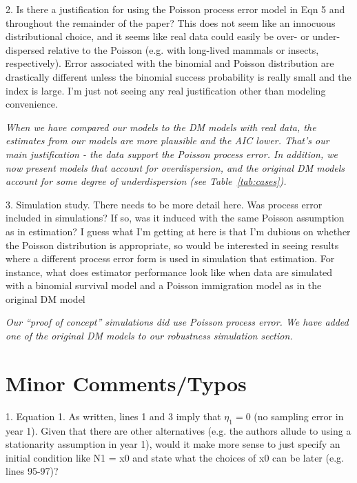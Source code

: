 \documentclass[12pt,english]{article}
\begin{document}
\begin{spacing}{1.9}
\begin{flushleft}
2. Is there a justification for using the Poisson process error model in Eqn 5 and throughout the remainder 
of the paper? This does not seem like an innocuous distributional choice, and it seems like real data could 
easily be over- or under-dispersed relative to the Poisson (e.g. with long-lived mammals or insects, respectively). 
Error associated with the binomial and Poisson distribution are drastically different unless the binomial success 
probability is really small and the index is large. I'm just not seeing any real justification other than modeling convenience.

\vspace{0.5cm}
\textit{When we have compared our models to the DM models with real data, the estimates from our models
are more plausible and the AIC lower.  That's our main justification - the data support the Poisson process error.
In addition, we now present models that account for overdispersion, and the original DM models account for
some degree of underdispersion (see Table~\ref{tab:cases}).}
\vspace{0.5cm}

3. Simulation study. There needs to be more detail here. Was process error included in simulations? If so, was it 
induced with the same Poisson assumption as in estimation? I guess what I'm getting at here is that I'm dubious 
on whether the Poisson distribution is appropriate, so would be interested in seeing results where a different process 
error form is used in simulation that estimation. For instance, what does estimator performance look like when data 
are simulated with a binomial survival model and a Poisson immigration model as in the original DM model

\vspace{0.5cm}
\textit{Our ``proof of concept'' simulations did use Poisson process error.  We have added one of the original DM
models to our robustness simulation section.}

\section*{Minor Comments/Typos}
1. Equation 1. As written, lines 1 and 3 imply that $\eta_1 = 0$ (no sampling error in year 1). Given that there are 
other alternatives (e.g. the authors allude to using a stationarity assumption in year 1), would it make more 
sense to just specify an initial condition like N1 = x0 and state what the choices of x0 can be later (e.g. lines 95-97)?


\end{flushleft}
\end{spacing}
\end{document}
